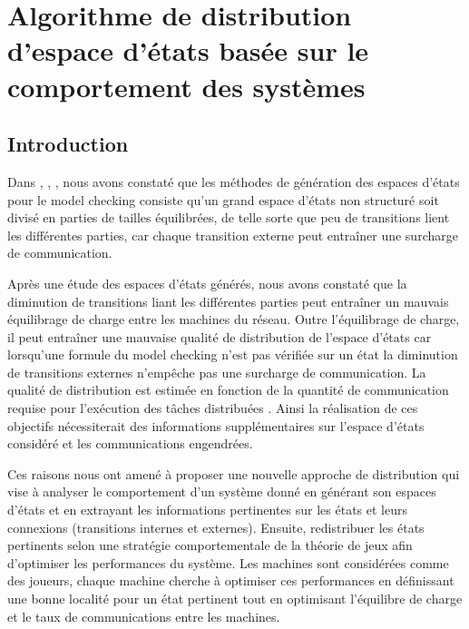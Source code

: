 \chapter{Algorithme de distribution d’espace d’états basée sur le comportement des systèmes}

 \section{Introduction}
Dans \citep{Saidouni2012}, \citep{TabibSaidouni2016}, \citep{BENSETIRA2017}, nous avons constaté que les méthodes de génération des espaces d’états pour le model checking consiste  qu’un grand espace d'états non structuré soit divisé en parties de tailles équilibrées, de telle sorte que peu de transitions lient les différentes  parties, car chaque transition externe peut entraîner une surcharge de communication.

Après une étude des espaces d'états générés, nous avons constaté que la diminution de transitions liant les différentes parties peut entraîner un mauvais équilibrage de charge entre les machines du réseau. Outre l’équilibrage de charge, il peut entraîner une mauvaise qualité de distribution de l'espace d'états car lorsqu'une formule du model checking n'est pas vérifiée sur un état la diminution de transitions externes n'empêche pas une surcharge de communication. La qualité de distribution est estimée en fonction de la quantité de communication requise pour l’exécution des tâches distribuées \citep{EzekielLuttgen2008}. Ainsi la réalisation de ces objectifs nécessiterait des informations supplémentaires sur l’espace d’états considéré et les communications engendrées. 

Ces raisons nous ont amené à proposer une nouvelle approche de distribution qui vise à analyser le comportement d’un système donné en générant son espaces d’états et en extrayant les informations pertinentes sur les états et leurs connexions (transitions internes et externes). Ensuite, redistribuer les états pertinents selon une stratégie comportementale de la théorie de jeux afin d’optimiser les performances du système. Les machines sont considérées comme des joueurs, chaque machine cherche à optimiser ces performances en définissant une bonne localité pour un état pertinent tout en optimisant l’équilibre de charge et le taux de communications entre les machines.
 
